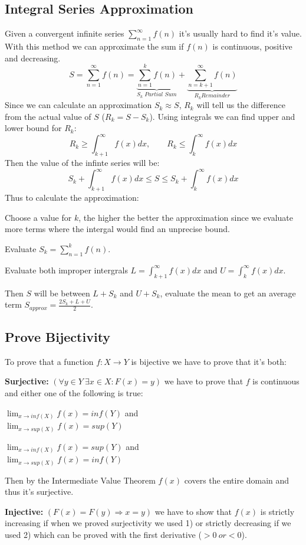 \documentclass[8pt,a4paper]{extarticle}     %
\theoremstyle{definition}
\theoremstyle{definition}
\theoremstyle{definition}
\begin{document}
\begin{multicols}{4}
\vfill\null
\columnbreak
\subsection{Integral Series Approximation}
Given a convergent infinite series $\sum_{n=1}^{\infty} f(n)$ it's usually hard to find it's value. With this method we can approximate the sum if $f(n)$ is continuous, positive and decreasing. 
$$S = \sum_{n=1}^{\infty} f(n) = \underbrace{\sum_{n=1}^{k}f(n)}_{S_k \textit{ Partial Sum}} + \underbrace{\sum_{n=k+1}^{\infty} f(n)}_{R_k \textit{Remainder}}$$
Since we can calculate an approximation $S_k \approx S$, $R_k$ will tell us the difference from the actual value of $S$ ($R_k = S-S_k$). Using integrals we can find upper and lower bound for $R_k$: 
$$R_k \geq \int_{k+1}^{\infty}f(x)dx, \qquad R_k \leq \int_{k}^{\infty}f(x)dx$$
Then the value of the infinte series will be: 
$$ S_k + \int_{k+1}^{\infty}f(x)dx \leq S \leq S_k + \int_{k}^{\infty}f(x)dx$$ 
Thus to calculate the approximation: 
\begin{numberlist}
	\item Choose a value for $k$, the higher the better the approximation since we evaluate more terms where the intergal would find an unprecise bound. 
	\item Evaluate $S_k = \sum_{n=1}^{k}f(n)$. 
	\item Evaluate both improper intergrals $L = \int_{k+1}^{\infty}f(x)dx$ and $U = \int_{k}^{\infty}f(x)dx$.
	\item Then $S$ will be between $L + S_k$ and $U + S_k$, evaluate the mean to get an average term $S_{\textit{approx}} = \frac{2S_k+L+U}{2}$.
\end{numberlist}
\subsection{Prove Bijectivity} 
To prove that a function $f: X\rightarrow Y$ is bijective we have to prove that it's both: 
\begin{bulletlist}
	\item \textbf{Surjective:} $(\forall y\in Y \ \exists x\in X: F(x) = y)$ we have to prove that $f$ is continuous and either one of the following is true: 
	\begin{numberlist}
		\item $\lim_{x\to inf(X)} f(x) = inf(Y)$ and \\$\lim_{x\to sup(X)} f(x) = sup(Y)$
		\item $\lim_{x\to inf(X)} f(x) = sup(Y)$ and \\$\lim_{x\to sup(X)} f(x) = inf(Y)$
	\end{numberlist}   
	Then by the Intermediate Value Theorem $f(x)$ covers the entire domain and thus it's surjective. 
	\item \textbf{Injective:} $(F(x) = F(y) \Rightarrow x = y)$ we have to show that $f(x)$ is strictly increasing if when we proved surjectivity we used 1) or strictly decreasing if we used 2) which can be proved with the first derivative ($> 0 \ or < 0$). 
\end{bulletlist}  

\end{multicols}
\end{document}
